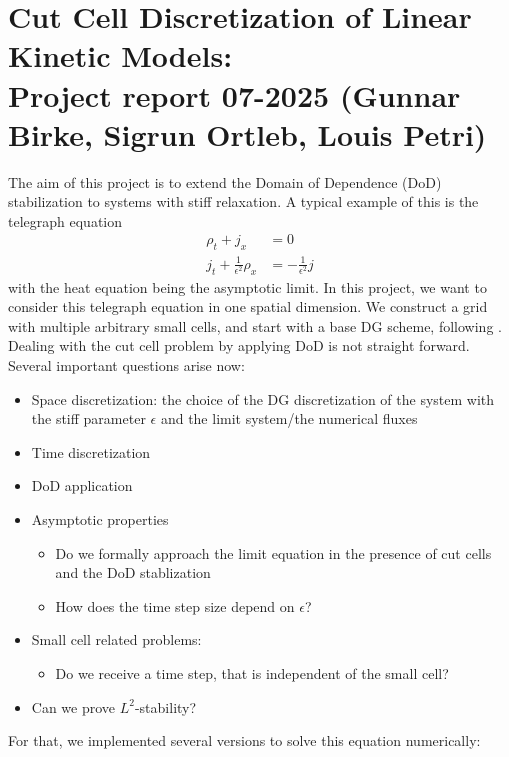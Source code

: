 \documentclass[]{article}
\title{}
\author{}
\date{}
\begin{document}
\section*{Cut Cell Discretization of Linear Kinetic Models:\\ Project report 07-2025 (Gunnar Birke, Sigrun Ortleb, Louis Petri)}


The aim of this project is to extend the Domain of Dependence (DoD) stabilization to systems with stiff relaxation.  A typical example of this is the telegraph equation
\begin{equation}
\begin{split}
	\rho_t + j_x & = 0\\
	j_t + \frac{1}{\epsilon^2}\rho_x & = -\frac{1}{\epsilon^2} j
\end{split}
\end{equation}
with the heat equation being the asymptotic limit.
In this project, we want to consider this telegraph equation in one spatial dimension. We construct a grid with multiple arbitrary small cells, and start with a base DG scheme, following \cite{Jang}.
Dealing with the cut cell problem by applying DoD is not straight forward. Several important questions arise now:
\vspace{\baselineskip}
\begin{itemize}
\item Space discretization: the choice of the DG discretization of the system with the stiff parameter $\epsilon$ and the limit system/the numerical fluxes
\item Time discretization
\item DoD application
\item Asymptotic properties
\begin{itemize}
\item Do we formally approach the limit equation in the presence of cut cells and the DoD stablization
\item How does the time step size depend on  $\epsilon$?
\end{itemize}
\item Small cell related problems:
\begin{itemize}
	\item Do we receive a time step, that is independent of the small cell?
\end{itemize}
\item Can we prove $L^2$-stability?
\end{itemize}
\vspace{\baselineskip}
For that, we implemented several versions to solve this equation numerically:
\end{document}
